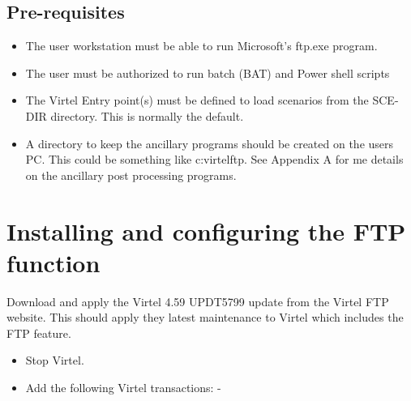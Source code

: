 \documentclass[letterpaper,10pt,english]{sphinxmanual}
\begin{document}
\subsection{Pre-requisites}
\label{\detokenize{Customization:pre-requisites}}\begin{itemize}
\item {} 
The user workstation must be able to run Microsoft’s ftp.exe program.

\item {} 
The user must be authorized to run batch (BAT) and Power shell scripts

\item {} 
The Virtel Entry point(s) must be defined to load scenarios from the SCE-DIR directory. This is normally the default.

\item {} 
A directory to keep the ancillary programs should be created on the users PC. This could be something like c:virtelftp. See Appendix A for me details on the ancillary post processing programs.

\end{itemize}


\section{Installing and configuring the FTP function}
\label{\detokenize{Customization:installing-and-configuring-the-ftp-function}}
Download and apply the Virtel 4.59 UPDT5799 update from the Virtel FTP website. This should apply they latest maintenance to Virtel which includes the FTP feature.
\begin{itemize}
\item {} 
Stop Virtel.

\item {} 
Add the following Virtel transactions: -

\end{itemize}
\end{document}
